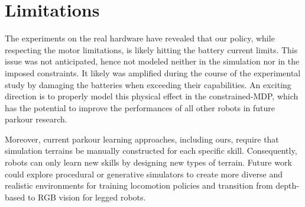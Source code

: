 \section{Limitations}

The experiments on the real hardware have revealed that our policy, while respecting the motor limitations, is likely hitting the battery current limits. This issue was not anticipated, hence not modeled neither in the simulation nor in the imposed constraints. It likely was amplified during the course of the experimental study by damaging the batteries when exceeding their capabilities. An exciting direction is to properly model this physical effect in the constrained-MDP, which has the potential to improve the performances of all other robots in future parkour research.

Moreover, current parkour learning approaches, including ours, require that simulation terrains be manually constructed for each specific skill.
Consequently, robots can only learn new skills by designing new types of terrain.
Future work could explore procedural or generative simulators to create more diverse and realistic environments for training locomotion policies and transition from depth-based to RGB vision for legged robots.
